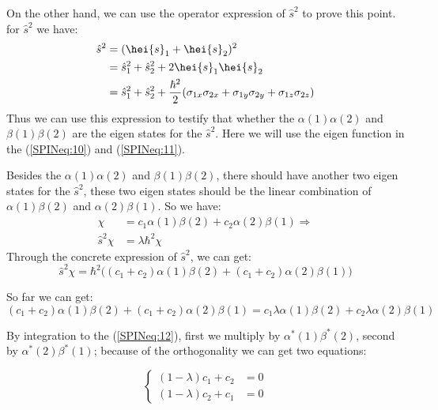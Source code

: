 On the other hand, we can use the operator expression of
$\hat{s}^{2}$ to prove this point. for $\hat{s}^{2}$ we have:
\begin{align}\label{}
\hat{s}^{2} &= (\hei{s}_{1} + \hei{s}_{2})^{2} \nonumber \\
            &= \hat{s}_{1}^{2} + \hat{s}_{2}^{2} +
            2\hei{s}_{1}\hei{s}_{2} \nonumber \\
            &= \hat{s}_{1}^{2} + \hat{s}_{2}^{2} +
            \frac{\hbar^{2}}{2}(\sigma_{1x}\sigma_{2x}+
            \sigma_{1y}\sigma_{2y}+
            \sigma_{1z}\sigma_{2z})
\end{align}
Thus we can use this expression to testify that whether the
$\alpha(1)\alpha(2)$ and $\beta(1)\beta(2)$ are the eigen states for
the $\hat{s}^{2}$. Here we will use the eigen function in the
(\ref{SPINeq:10}) and (\ref{SPINeq:11}).

Besides the $\alpha(1)\alpha(2)$ and $\beta(1)\beta(2)$, there
should have another two eigen states for the $\hat{s}^{2}$, these
two eigen states should be the linear combination of
$\alpha(1)\beta(2)$ and $\alpha(2)\beta(1)$. So we have:
\begin{align}\label{}
\chi &= c_{1}\alpha(1)\beta(2) + c_{2}\alpha(2)\beta(1) \Rightarrow
\nonumber \\
\hat{s}^{2}\chi &= \lambda\hbar^{2}\chi
\end{align}
Through the concrete expression of $\hat{s}^{2}$, we can get:
\begin{equation}\label{}
\hat{s}^{2}\chi = \hbar^{2}\Big ( (c_{1}+c_{2})\alpha(1)\beta(2) +
(c_{1}+c_{2})\alpha(2)\beta(1)\Big)
\end{equation}

So far we can get:
\begin{equation}\label{SPINeq:12}
(c_{1}+c_{2})\alpha(1)\beta(2) + (c_{1}+c_{2})\alpha(2)\beta(1)
=c_{1}\lambda\alpha(1)\beta(2) + c_{2}\lambda\alpha(2)\beta(1)
\end{equation}

By integration to the (\ref{SPINeq:12}), first we multiply by
$\alpha^{*}(1)\beta^{*}(2)$, second by $\alpha^{*}(2)\beta^{*}(1)$;
because of the orthogonality we can get two equations:

\begin{equation} \label{SPINeq:13}
\left\{
\begin{aligned}
(1-\lambda)c_{1} + c_{2} &= 0  \\
(1-\lambda)c_{2} + c_{1} &= 0
\end{aligned} \right.
\end{equation}

